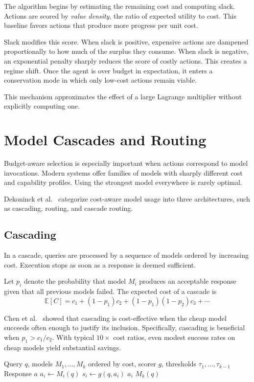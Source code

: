 The algorithm begins by estimating the remaining cost and computing slack. Actions are scored by \emph{value density}, the ratio of expected utility to cost. This baseline favors actions that produce more progress per unit cost.

Slack modifies this score. When slack is positive, expensive actions are dampened proportionally to how much of the surplus they consume. When slack is negative, an exponential penalty sharply reduces the score of costly actions. This creates a regime shift. Once the agent is over budget in expectation, it enters a conservation mode in which only low-cost actions remain viable.

This mechanism approximates the effect of a large Lagrange multiplier without explicitly computing one.

\section{Model Cascades and Routing}

Budget-aware selection is especially important when actions correspond to model invocations. Modern systems offer families of models with sharply different cost and capability profiles. Using the strongest model everywhere is rarely optimal.

Dekoninck et al.\ \cite{dekoninck2025cascade} categorize cost-aware model usage into three architectures, such as cascading, routing, and cascade routing.

\subsection{Cascading}

In a cascade, queries are processed by a sequence of models ordered by increasing cost. Execution stops as soon as a response is deemed sufficient.

Let $p_i$ denote the probability that model $M_i$ produces an acceptable response given that all previous models failed. The expected cost of a cascade is
\[
\mathbb{E}[C] = c_1 + (1-p_1)c_2 + (1-p_1)(1-p_2)c_3 + \cdots
\]

Chen et al.\ \cite{chen2023frugalgpt} showed that cascading is cost-effective when the cheap model succeeds often enough to justify its inclusion. Specifically, cascading is beneficial when $p_1 > c_1 / c_2$. With typical $10\times$ cost ratios, even modest success rates on cheap models yield substantial savings.

\begin{algorithm}
\caption{LLM Cascade with Learned Routing}
\begin{algorithmic}[1]
\Require Query $q$, models $M_1, \ldots, M_k$ ordered by cost, scorer $g$, thresholds $\tau_1, \ldots, \tau_{k-1}$
\Ensure Response $a$
    \State $a_i \gets M_i(q)$
    \State $s_i \gets g(q, a_i)$
        \State \Return $a_i$
    \EndIf
\EndFor
\State \Return $M_k(q)$
\end{algorithmic}
\end{algorithm}

